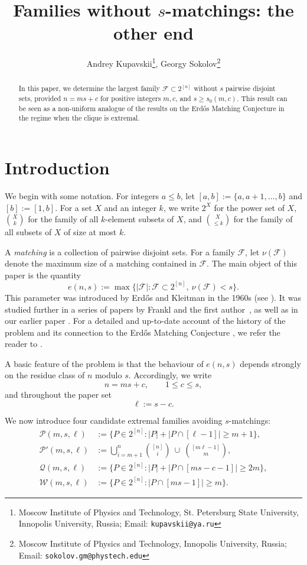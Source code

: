 \documentclass[12pt,a4paper]{article}
\title{Families without $s$-matchings: the other end}
\author{Andrey Kupavskii\footnote{Moscow Institute of Physics and Technology, St. Petersburg State University, Innopolis University, Russia; Email: {\tt kupavskii@ya.ru}}, Georgy Sokolov\footnote{Moscow Institute of Physics and Technology, Innopolis University, Russia; Email: {\tt sokolov.gm@phystech.edu}}}
\begin{document}
	\maketitle
\begin{abstract}
    In this paper, we determine the largest family $\mathcal F \subset 2^{[n]}$ without $s$ pairwise disjoint sets, provided  $n=ms+c$ for positive integers $m,c$, and $s \geq s_0(m, c)$. This result can be seen as a non-uniform analogue of the results on the Erd\H os Matching Conjecture in the regime when the clique is extremal. 
\end{abstract}
\section{Introduction}

We begin with some notation. For integers $a\le b$, let
$[a,b]:=\{a,a+1,\ldots,b\}$ and $[b]:=[1,b].$
For a set $X$ and an integer $k$, we write $2^X$ for the power set of $X$, ${X\choose k}$ for the family of all $k$-element subsets of $X$, and ${X\choose \le k}$ for the family of all subsets of $X$ of size at most $k$.

A {\it matching} is a collection of pairwise disjoint sets. For a family $\mathcal F$, let $\nu(\mathcal F)$ denote the maximum size of a matching contained in $\mathcal F$. The main object of this paper is the quantity
\[
e(n,s):=\max\bigl\{|\mathcal F|:\mathcal F\subset 2^{[n]},\ \nu(\mathcal F)<s\bigr\}.
\]
This parameter was introduced by Erd\H{o}s and Kleitman in the 1960s (see \cite{Kl}). It was studied further in a series of papers by Frankl and the first author~\cite{FK9,FK6,FK8}, as well as in our earlier paper \cite{KS}. For a detailed and up-to-date account of the history of the problem and its connection to the Erd\H{o}s Matching Conjecture \cite{E}, we refer the reader to \cite{KS}.

A basic feature of the problem is that the behaviour of $e(n,s)$ depends strongly on the residue class of $n$ modulo $s$. Accordingly, we write
\[
n=ms+c, \qquad 1\le c\le s,
\]
and throughout the paper set
\[
\ell:=s-c.
\]

We now introduce four candidate extremal families avoiding $s$-matchings:
\begin{align*}
\mathcal P(m,s,\ell) &:= \{P\in 2^{[n]}: |P|+|P\cap [\ell-1]|\ge m+1\},\\
\mathcal P'(m,s,\ell) &:= \bigcup_{i=m+1}^n {[n]\choose i}\ \cup\ {[m\ell-1]\choose m},\\
\mathcal Q(m,s,\ell) &:= \{P\in 2^{[n]}: |P|+|P\cap [ms-c-1]|\ge 2m\},\\
\mathcal W(m,s,\ell) &:= \{P\in 2^{[n]}: |P\cap [ms-1]|\ge m\}.
\end{align*}
\end{document}

